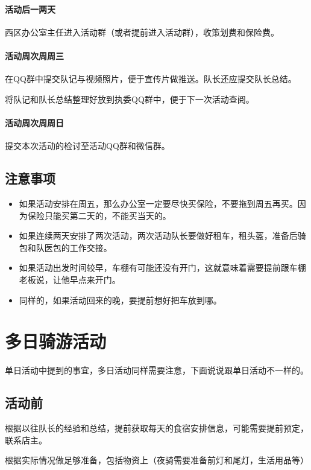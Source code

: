 \documentclass{ctexbook}
\begin{document}
\paragraph{活动后一两天}
西区办公室主任进入活动群（或者提前进入活动群），收策划费和保险费。
\paragraph{活动周次周周三}

在QQ群中提交队记与视频照片，便于宣传片做推送。队长还应提交队长总结。

将队记和队长总结整理好放到执委QQ群中，便于下一次活动查阅。

\paragraph{活动周次周周日}

提交本次活动的检讨至活动QQ群和微信群。
\subsection{注意事项}
    \begin{itemize}
        \item 如果活动安排在周五，那么办公室一定要尽快买保险，不要拖到周五再买。因为保险只能买第二天的，不能买当天的。
        \item 如果连续两天安排了两次活动，两次活动队长要做好租车，租头盔，准备后骑包和队医包的工作交接。
        \item 如果活动出发时间较早，车棚有可能还没有开门，这就意味着需要提前跟车棚老板说，让他早点来开门。
        \item 同样的，如果活动回来的晚，要提前想好把车放到哪。
    \end{itemize}


\section{多日骑游活动}

单日活动中提到的事宜，多日活动同样需要注意，下面说说跟单日活动不一样的。

\subsection{活动前}

根据以往队长的经验和总结，提前获取每天的食宿安排信息，可能需要提前预定，联系店主。

根据实际情况做足够准备，包括物资上（夜骑需要准备前灯和尾灯，生活用品等）
\end{document}
